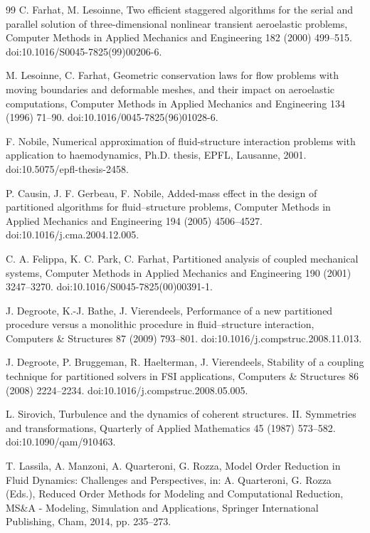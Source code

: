 \documentclass[11pt]{article}
\begin{document}
\begin{thebibliography}{99}
C. Farhat, M. Lesoinne, Two efficient staggered algorithms for the serial and parallel solution of three-dimensional nonlinear transient aeroelastic problems, Computer Methods in Applied Mechanics and Engineering 182 (2000) 499--515. doi:10.1016/S0045-7825(99)00206-6.

M. Lesoinne, C. Farhat, Geometric conservation laws for flow problems with moving boundaries and deformable meshes, and their impact on aeroelastic computations, Computer Methods in Applied Mechanics and Engineering 134 (1996) 71--90. doi:10.1016/0045-7825(96)01028-6.

F. Nobile, Numerical approximation of fluid-structure interaction problems with application to haemodynamics, Ph.D. thesis, EPFL, Lausanne, 2001. doi:10.5075/epfl-thesis-2458.

P. Causin, J. F. Gerbeau, F. Nobile, Added-mass effect in the design of partitioned algorithms for fluid--structure problems, Computer Methods in Applied Mechanics and Engineering 194 (2005) 4506--4527. doi:10.1016/j.cma.2004.12.005.

C. A. Felippa, K. C. Park, C. Farhat, Partitioned analysis of coupled mechanical systems, Computer Methods in Applied Mechanics and Engineering 190 (2001) 3247--3270. doi:10.1016/S0045-7825(00)00391-1.

J. Degroote, K.-J. Bathe, J. Vierendeels, Performance of a new partitioned procedure versus a monolithic procedure in fluid--structure interaction, Computers \& Structures 87 (2009) 793--801. doi:10.1016/j.compstruc.2008.11.013.

J. Degroote, P. Bruggeman, R. Haelterman, J. Vierendeels, Stability of a coupling technique for partitioned solvers in FSI applications, Computers \& Structures 86 (2008) 2224--2234. doi:10.1016/j.compstruc.2008.05.005.

L. Sirovich, Turbulence and the dynamics of coherent structures. II. Symmetries and transformations, Quarterly of Applied Mathematics 45 (1987) 573--582. doi:10.1090/qam/910463.

T. Lassila, A. Manzoni, A. Quarteroni, G. Rozza, Model Order Reduction in Fluid Dynamics: Challenges and Perspectives, in: A. Quarteroni, G. Rozza (Eds.), Reduced Order Methods for Modeling and Computational Reduction, MS\&A - Modeling, Simulation and Applications, Springer International Publishing, Cham, 2014, pp. 235--273.


\end{thebibliography}
\end{document}
